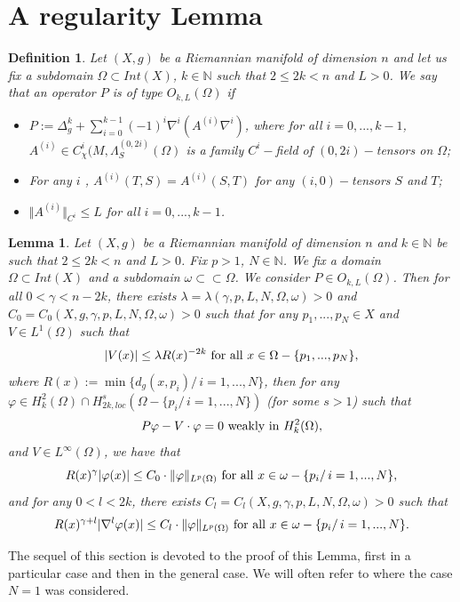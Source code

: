 \documentclass[reqno]{amsart}
\newtheorem{defi}{Definition}[section]
\newtheorem{lemma}{Lemma}[section]
\def \nn {\mathbb{N}}
\begin{document}
\section{A regularity Lemma}\label{sec:lemma}
\begin{defi}\label{def:P:loc} Let $(X,g)$ be a Riemannian manifold of dimension $n$ and let us fix a subdomain $\Omega\subset Int(X)$, $k\in\nn$ such that $2\leq 2k<n$ and $ L>0$. We say that an operator $P$ is of type $O_{k,L}(\Omega)$ if 
\begin{itemize}
\item[(i)] $P:=\Delta_g^k+\sum_{i=0}^{k-1} (-1)^i\nabla^i(A^{(i)} \nabla^i)$, where for all $i=0,...,k-1$, $ A^{(i)}\in C^{i}_{\chi}(M,\Lambda_{S}^{(0,2i)}(\Omega)$ is a family $C^{i}-$field of $(0,2i)-$tensors on $\Omega$;
\item[(ii)] For any $i$ , $A^{(i)}(T,S)=A^{(i)}(S,T)$ for any $(i,0)-$tensors $S$ and $T$; \par
\item[(iii)]  $\Vert A^{(i)}\Vert_{C^{i}}\leq L$ for all $i=0,...,k-1$.\par
\end{itemize}
\end{defi}
\begin{lemma}\label{lem:bis} Let $(X,g)$ be a Riemannian manifold  of dimension $n$ and $k\in\nn$ be such that $2\leq 2k<n$ and $L>0$. Fix $p>1$, $N\in\nn$. We fix  a domain $\Omega\subset Int(X)$ and a subdomain $\omega\subset\subset \Omega$. We consider  $P\in O_{k,L}(\Omega)$.
Then for all $0<\gamma<n-2k$, there exists $\lambda=\lambda(\gamma,p, L,N,\Omega, \omega)> 0$ and $C_0=C_0(X,g,\gamma,p, L,N,\Omega,\omega)>0$ such that for any $p_1,...,p_N\in X$ and $V\in L^1(\Omega)$ such that
$$|V(x)|\leq \lambda R(x)^{-2k}\hbox{ for all }x\in \Omega-\{p_1,...,p_N\},$$
where $R(x):=\min\{d_g(x,p_i)/\, i=1,...,N\}$, 
then for any $\varphi\in H_k^2(\Omega)\cap H_{2k,loc}^s(\Omega-\{p_i/\, i=1,...,N\})$ (for some $s>1$)  such that
$$P\varphi-V\cdot\varphi=0\hbox{ weakly in }H_k^2(\Omega),$$
and $V\in L^\infty(\Omega)$, we have that
\begin{equation}\label{ineq:lem:bis}
R(x)^{\gamma}|\varphi(x)|\leq C_0\cdot \Vert\varphi\Vert_{L^p(\Omega)}\hbox{ for all }x\in \omega-\{p_i/\, i=1,...,N\},
\end{equation}
and for any $0< l<2k$, there exists $C_l=C_l(X,g,\gamma,p, L,N,\Omega,\omega)>0$ such that
\begin{equation}\label{ineq:lem:l:bis}
R(x)^{\gamma+l}|\nabla^l\varphi(x)|\leq C_l\cdot \Vert\varphi\Vert_{L^p(\Omega)}\hbox{ for all }x\in \omega-\{p_i/\, i=1,...,N\}.
\end{equation}
\end{lemma}
The sequel of this section is devoted to the proof of this Lemma, first in a particular case and then in the general case. We will often refer to \cite{robert:gjms} where the case $N=1$ was considered.
\end{document}
